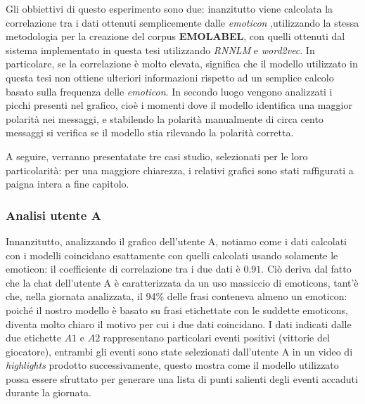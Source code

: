 \documentclass[a4paper,12pt,openright,twoside]{report}
\theoremstyle{definition}
\begin{document}
Gli obbiettivi di questo esperimento sono due: inanzitutto viene calcolata la correlazione
tra i dati ottenuti semplicemente dalle \emph{emoticon} ,utilizzando la stessa metodologia
per la creazione del corpus \textbf{EMOLABEL}, con quelli ottenuti dal sistema implementato
in questa tesi utilizzando \emph{RNNLM} e \emph{word2vec}. In particolare, se la correlazione è molto
elevata, significa che il modello utilizzato in questa tesi non ottiene ulteriori informazioni
rispetto ad un semplice calcolo basato sulla frequenza delle \emph{emoticon}. In secondo
luogo vengono analizzati i picchi presenti nel grafico, cioè i momenti dove il modello
identifica una maggior polarità nei messaggi, e stabilendo la polarità manualmente di
circa cento messaggi si verifica se il modello stia rilevando la polarità corretta.
 
A seguire, verranno presentatate tre casi studio, selezionati per le loro particolarità:
per una maggiore chiarezza, i relativi grafici sono stati raffigurati a paigna intera a fine
capitolo.

\subsubsection{Analisi utente A}
Innanzitutto, analizzando il grafico dell'utente A, notiamo come i dati calcolati con i modelli coincidano esattamente
con quelli calcolati usando solamente le emoticon: il coefficiente di correlazione tra i due dati è $0.91$. 
Ciò deriva dal fatto che la chat dell'utente A è caratterizzata da
un uso massiccio di emoticons, tant'è che, nella giornata analizzata, il 94\% delle frasi conteneva almeno un emoticon:
poiché il nostro modello è basato su frasi etichettate con le suddette emoticons, diventa molto chiaro il motivo per cui i due dati coincidano.
I dati indicati dalle due etichette $A1$ e $A2$ rappresentano particolari eventi positivi (vittorie del giocatore),
entrambi gli eventi sono state selezionati dall'utente A in un video di \emph{highlights} prodotto successivamente,
questo mostra come il modello utilizzato possa essere sfruttato per generare una lista di punti salienti degli
eventi accaduti durante la giornata.
\end{document}
